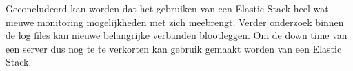 \documentclass[fleqn,10pt]{voorstel}
\begin{document}
Geconcludeerd kan worden dat het gebruiken van een Elastic Stack heel wat nieuwe monitoring mogelijkheden met zich meebrengt. Verder onderzoek binnen de log files kan nieuwe belangrijke verbanden blootleggen. Om de down time van een server dus nog te te verkorten kan gebruik gemaakt worden van een Elastic Stack.


\printbibliography[heading=bibintoc]
\end{document}
